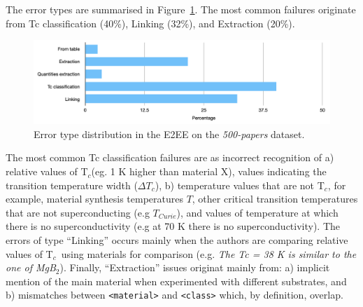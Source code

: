 \documentclass{article}
\newcommand{\tc}{T$_{c}$}
\begin{document}
The error types are summarised in Figure~\ref{fig:error-types-distribution}. The most common failures  originate from Tc classification (40\%), Linking (32\%), and Extraction (20\%).

\begin{figure}[ht!]
\centering
\includegraphics[width=\linewidth]{error-types-bars-perc}
\caption{Error type distribution in the E2EE on the \textit{500-papers} dataset.}
\label{fig:error-types-distribution}
\end{figure}


The most common Tc classification failures are as incorrect recognition of a) relative values of \tc (eg. 1 K higher than material X), values indicating the transition temperature width ($\Delta T_{c}$),  b) temperature values that are not \tc, for example, material synthesis temperatures $T$, other critical transition temperatures that are not superconducting (e.g $T_{Curie}$), and values of temperature at which there is no superconductivity (e.g at 70 K there is no superconductivity).
The errors of type ``Linking'' occurs mainly when the authors are comparing relative values of \tc~using materials for comparison (e.g. \textit{The Tc = 38 K is similar to the one of MgB$_{2}$}). 
Finally, ``Extraction'' issues originat mainly from: a) implicit mention of the main material when experimented with different substrates, and b) mismatches between \texttt{<material>} and \texttt{<class>} which, by definition, overlap. 

\end{document}
